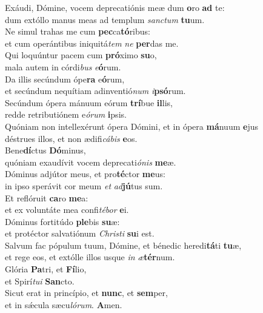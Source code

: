\evenverse Exáudi, Dómine, vocem deprecatiónis meæ dum \textbf{o}ro \textbf{ad} te:~\*\\
\evenverse dum extóllo manus meas ad templum \textit{san}\textit{ctum} \textbf{tu}um.\\
\oddverse Ne simul trahas me cum \textbf{pec}ca\textbf{tó}ribus:~\*\\
\oddverse et cum operántibus iniquitá\textit{tem} \textit{ne} \textbf{per}das me.\\
\evenverse Qui loquúntur pacem cum \textbf{pró}ximo \textbf{su}o,~\*\\
\evenverse mala autem in córdi\textit{bus} \textit{e}\textbf{ó}rum.\\
\oddverse Da illis secúndum ópe\textbf{ra} e\textbf{ó}rum,~\*\\
\oddverse et secúndum nequítiam adinventió\textit{num} \textit{i}\textbf{psó}rum.\\
\evenverse Secúndum ópera mánuum eórum \textbf{trí}bue \textbf{il}lis,~\*\\
\evenverse redde retributiónem e\textit{ó}\textit{rum} \textbf{i}psis.\\
\oddverse Quóniam non intellexérunt ópera Dómini, et in ópera \textbf{má}nuum \textbf{e}jus~\*\\
\oddverse déstrues illos, et non ædifi\textit{cá}\textit{bis} \textbf{e}os.\\
\evenverse Bene\textbf{dí}ctus \textbf{Dó}minus,~\*\\
\evenverse quóniam exaudívit vocem deprecati\textit{ó}\textit{nis} \textbf{me}æ.\\
\oddverse Dóminus adjútor meus, et pro\textbf{té}ctor \textbf{me}us:~\*\\
\oddverse in ipso sperávit cor meum \textit{et} \textit{ad}\textbf{jú}tus sum.\\
\evenverse Et reflóruit \textbf{ca}ro \textbf{me}a:~\*\\
\evenverse et ex voluntáte mea confi\textit{té}\textit{bor} \textbf{e}i.\\
\oddverse Dóminus fortitúdo \textbf{ple}bis \textbf{su}æ:~\*\\
\oddverse et protéctor salvatiónum \textit{Chri}\textit{sti} \textbf{su}i est.\\
\evenverse Salvum fac pópulum tuum, Dómine, et bénedic heredi\textbf{tá}ti \textbf{tu}æ,~\*\\
\evenverse et rege eos, et extólle illos usque \textit{in} \textit{æ}\textbf{tér}num.\\
\oddverse Glória \textbf{Pa}tri, et \textbf{Fí}lio,~\*\\
\oddverse et Spirí\textit{tu}\textit{i} \textbf{San}cto.\\
\evenverse Sicut erat in princípio, et \textbf{nunc}, et \textbf{sem}per,~\*\\
\evenverse et in sǽcula sæcu\textit{ló}\textit{rum}. \textbf{A}men.\\
